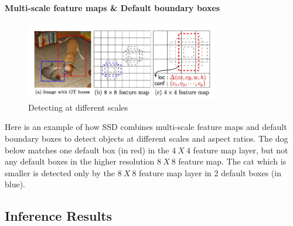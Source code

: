 \documentclass[12pt]{article}
\begin{document}
\paragraph{Multi-scale feature maps \& Default boundary boxes}
\begin{figure}[h]
    \centering
    \includegraphics[width=0.75\textwidth]{images/ssd_cat_dog.png}
    \caption{Detecting at different scales}
    \label{fig:ssd4}
\end{figure}
{
\fontsize{12}{14}\selectfont
Here is an example of how SSD combines multi-scale feature maps and default boundary boxes to detect objects at different scales and aspect ratios. The dog below matches one default box (in red) in the $4\ X\ 4$ feature map layer, but not any default boxes in the higher resolution $8\ X\ 8$ feature map. The cat which is smaller is detected only by the $8\ X\ 8$ feature map layer in 2 default boxes (in blue).
}

\subsection{Inference Results}
\end{document}
